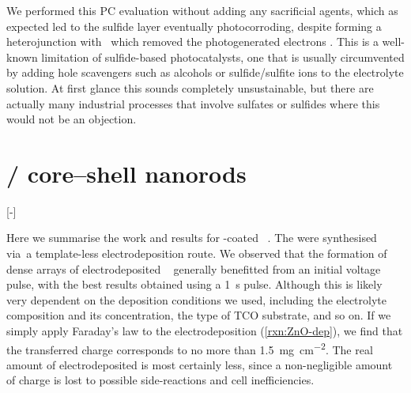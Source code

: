 \documentclass[draft,webedition,openright,titles,swedish,english]{LuaUUThesis}\usepackage[]{graphicx}\usepackage[]{xcolor}
\newcommand{\via}{via}
\begin{document}
We performed this \gls{PC} evaluation without adding any sacrificial agents,
which as expected led to the sulfide layer eventually photocorroding, despite
forming a heterojunction with \ZnO\ which removed the photogenerated electrons \cite{Jafari2016}.
This is a well-known limitation of sulfide-based photocatalysts, one that is
usually circumvented by adding hole scavengers such as alcohols or sulfide/sulfite ions
to the electrolyte solution. At first glance this sounds completely unsustainable, but
there are actually many industrial processes that involve sulfates or sulfides
where this would not be an objection.




\clearpage
%


%















%

\section{\texorpdfstring{/ core--shell nanorods}{ZnO/Fe₂O₃ core–shell nanorods}}
\label{results:P03-ZnO-Fe2O3-nanorods}
[-\baselineskip]

Here we summarise the work and results for \ironox-coated \ZnO\ .
The  were synthesised \via\ a template-less electrodeposition route.
We observed that the formation of dense arrays of electrodeposited \zincox\ 
generally benefitted from an initial voltage pulse, with the best results obtained
using a \qty{1}{\second} pulse.
Although this is likely very dependent on the deposition conditions we used,
including the electrolyte composition and its concentration, the type of
\gls{TCO} substrate, and so on.
If we simply apply Faraday's law to the  electrodeposition
(\cref{rxn:ZnO-dep}), we find that the
transferred charge corresponds to no more than \qty{1.5}{\mg\per\square\cm}.
The real amount of electrodeposited  is most certainly less, since
a non-negligible amount of charge is lost to possible side-reactions and
cell inefficiencies.
\end{document}
